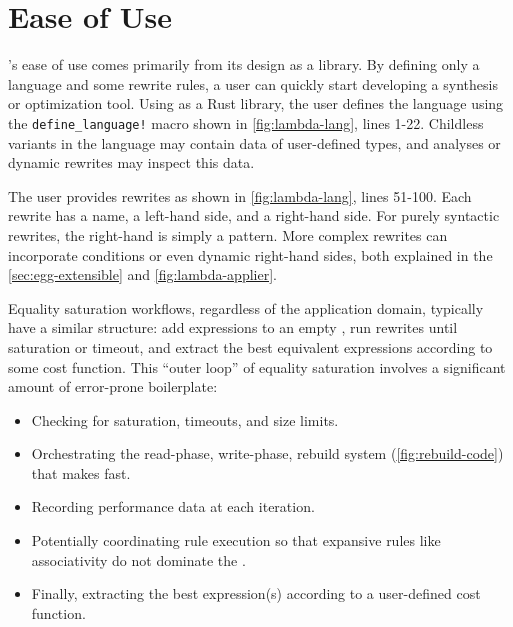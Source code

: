 \section{Ease of Use}
\label{sec:egg-easy}



\egg's ease of use comes primarily from its design as a library.
By defining only a language and some rewrite rules,
  a user can quickly
  start developing a synthesis or optimization tool.
Using \egg as a Rust library,
  the user defines the language using the \texttt{define\_language!} macro
  shown in \autoref{fig:lambda-lang}, lines 1-22.
Childless variants in the language may contain data of user-defined types,
  and \eclass analyses or dynamic rewrites may inspect this data.


The user provides rewrites as shown in
  \autoref{fig:lambda-lang}, lines 51-100.
Each rewrite has a name, a left-hand side, and a right-hand side.
For purely syntactic rewrites, the right-hand is simply a pattern.
More complex rewrites can incorporate conditions or even dynamic right-hand
  sides, both explained in the \autoref{sec:egg-extensible} and \autoref{fig:lambda-applier}.

Equality saturation workflows, regardless of the application domain,
  typically have a similar structure:
add expressions to an empty \egraph, run rewrites until saturation or
  timeout, and extract the best equivalent expressions according to some cost
  function.
This ``outer loop'' of equality saturation involves a significant amount of
  error-prone boilerplate:
\begin{itemize}
  \item Checking for saturation, timeouts, and \egraph size limits.
  \item Orchestrating the read-phase, write-phase, rebuild system
    (\autoref{fig:rebuild-code}) that makes \egg fast.
  \item Recording performance data at each iteration.
  \item Potentially coordinating rule execution so that expansive rules like
    associativity do not dominate the \egraph.
  \item Finally, extracting the best expression(s) according to a
  user-defined cost function.
\end{itemize}

